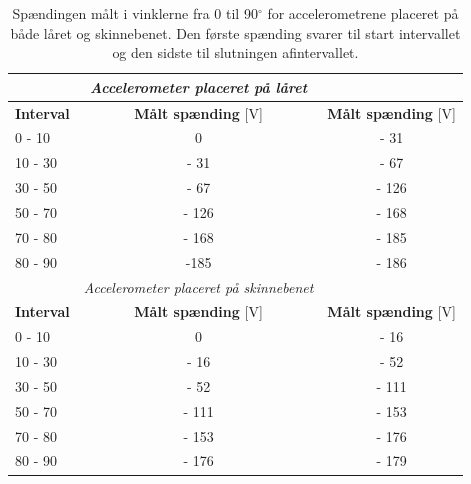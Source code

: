 \begin{table}[H]
\centering
\begin{tabular}{|l|c|c|}
         & \textit{Accelerometer placeret på låret}                           & \multicolumn{1}{|l|}{}                      \\ \hline
\textbf{Interval} & \textbf{Målt spænding} {[}V{]}                                              & \multicolumn{1}{|l|}{\textbf{Målt spænding} {[}V{]}} \\ \hline
0 - 10   & 0                                                                  & - 31                                      \\ \hline
10 - 30  & - 31                                                               & - 67                                      \\ \hline
30 - 50  & - 67                                                               & - 126                                     \\ \hline
50 - 70  & - 126                                                              & - 168                                     \\ \hline
70 - 80  & - 168                                                              & - 185                                     \\
\hline
80 - 90  & -185                                                               & - 186                                     \\
\hline
         & \multicolumn{1}{|l|}{\textit{Accelerometer placeret på skinnebenet}} & \multicolumn{1}{l}{}                      \\ \hline
\textbf{Interval} & \textbf{Målt spænding} {[}V{]}                                              & \multicolumn{1}{|l|}{\textbf{Målt spænding} {[}V{]}} \\ \hline
0 - 10   & 0                                                                  & - 16                                      \\
\hline
10 - 30  & - 16                                                               & - 52                                      \\
\hline
30 - 50  & - 52                                                               & - 111                                     \\
\hline
50 - 70  & - 111                                                              & - 153                                     \\
\hline
70 - 80  & - 153                                                              & - 176                                     \\
\hline
80 - 90  & - 176                                                              & - 179    \\ \hline 
\end{tabular}
\caption{Spændingen målt i vinklerne fra 0 til 90$^{\circ}$ for accelerometrene placeret på både låret og skinnebenet. Den første spænding svarer til start intervallet og den sidste til slutningen afintervallet.}
\label{tab:vinkelinterval_psoc}        
\end{table}

